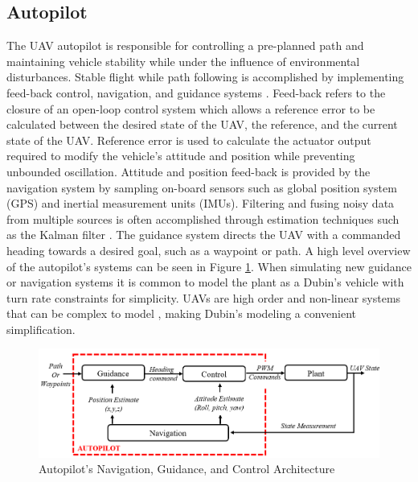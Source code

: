 \documentclass[numbered,pdftex]{ohio-etd}
\begin{document}
\subsection{Autopilot}
The UAV autopilot is responsible for controlling a pre-planned path and maintaining vehicle stability while under the influence of environmental disturbances. Stable flight while path following is accomplished by implementing feed-back control, navigation, and guidance systems \cite{beard_small_2012}. Feed-back refers to the closure of an open-loop control system which allows a reference error to be calculated between the desired state of the UAV, the reference, and the current state of the UAV. Reference error is used to calculate the actuator output required to modify the vehicle's attitude and position while preventing unbounded oscillation. Attitude and position feed-back is provided by the navigation system by sampling on-board sensors such as global position system (GPS) and inertial measurement units (IMUs). Filtering and fusing noisy data from multiple sources is often accomplished through estimation techniques such as the Kalman filter \cite{de_marina_guidance_2017}. The guidance system directs the UAV with a commanded heading towards a desired goal, such as a waypoint or path. A high level overview of the autopilot's systems can be seen in Figure \ref{fig:autopilotloops}. When simulating new guidance or navigation systems it is common to model the plant as a Dubin's vehicle with turn rate constraints for simplicity. UAVs are high order and non-linear systems that can be complex to model \cite{beard_small_2012}, making Dubin's modeling a convenient simplification.



%
%
%




\begin{figure}[H]
	\centering
	\includegraphics[width=15cm]{PaperFigures/autopilotLoops2}
	\caption{Autopilot's Navigation, Guidance, and Control Architecture}
	\label{fig:autopilotloops}
\end{figure}
\end{document}
